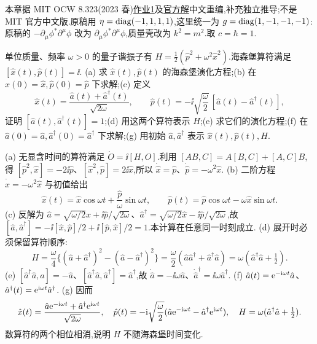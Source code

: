 本章据 MIT OCW 8.323(2023 春)\href{https://ocw.mit.edu/courses/8-323-relativistic-quantum-field-theory-i-spring-2023/mit8_323_s23_pset01.pdf}{作业1}及\href{https://ocw.mit.edu/courses/8-323-relativistic-quantum-field-theory-i-spring-2023/mit8_323_s23_pset_01sol.pdf}{官方解}中文重编,补充独立推导;不是 MIT 官方中文版.原稿用 $\eta=\operatorname{diag}(-1,1,1,1)$,这里统一为 $g=\operatorname{diag}(1,-1,-1,-1)$:原稿的 $-\partial_\mu\phi^*\partial^\mu\phi$ 改为 $\partial_\mu\phi^*\partial^\mu\phi$,质量壳改为 $k^2=m^2$.取 $c=\hbar=1$.

\begin{exercise}
单位质量、频率 $\omega>0$ 的量子谐振子有 $H=\tfrac12(\hat p^2+\omega^2\hat x^2)$.海森堡算符满足 $[\hat x(t),\hat p(t)]=\ii$.
(a) 求 $\hat x(t),\hat p(t)$ 的海森堡演化方程;(b) 在 $\hat x(0)=\hat x,\hat p(0)=\hat p$ 下求解;(c) 定义
\[
\hat x(t)=\frac{\hat a(t)+\hat a^\dagger(t)}{\sqrt{2\omega}},\qquad
\hat p(t)=-\ii\sqrt{\frac\omega2}\,[\hat a(t)-\hat a^\dagger(t)],
\]
证明 $[\hat a(t),\hat a^\dagger(t)]=1$;(d) 用这两个算符表示 $H$;(e) 求它们的演化方程;(f) 在 $\hat a(0)=\hat a,\hat a^\dagger(0)=\hat a^\dagger$ 下求解;(g) 用初始 $\hat a,\hat a^\dagger$ 表示 $\hat x(t),\hat p(t),H$.
\end{exercise}
\begin{solution}
(a) 无显含时间的算符满足 $\dot O=\ii[H,O]$.利用 $[AB,C]=A[B,C]+[A,C]B$,得 $[\hat p^2,\hat x]=-2\ii\hat p$、$[\hat x^2,\hat p]=2\ii\hat x$,所以 $\dot{\hat x}=\hat p$、$\dot{\hat p}=-\omega^2\hat x$.
(b) 二阶方程 $\ddot{\hat x}=-\omega^2\hat x$ 与初值给出
\[
\hat x(t)=\hat x\cos\omega t+\frac{\hat p}{\omega}\sin\omega t,\qquad
\hat p(t)=\hat p\cos\omega t-\omega\hat x\sin\omega t.
\]
(c) 反解为 $\hat a=\sqrt{\omega/2}\hat x+\ii\hat p/\sqrt{2\omega}$、$\hat a^\dagger=\sqrt{\omega/2}\hat x-\ii\hat p/\sqrt{2\omega}$,故
$[\hat a,\hat a^\dagger]=-\ii[\hat x,\hat p]/2+\ii[\hat p,\hat x]/2=1$.本计算在任意同一时刻成立.
(d) 展开时必须保留算符顺序:
\[
H=\frac\omega4\{(\hat a+\hat a^\dagger)^2-(\hat a-\hat a^\dagger)^2\}
=\frac\omega2(\hat a\hat a^\dagger+\hat a^\dagger\hat a)
=\omega(\hat a^\dagger\hat a+\tfrac12).
\]
(e) $[\hat a^\dagger\hat a,\hat a]=-\hat a$、$[\hat a^\dagger\hat a,\hat a^\dagger]=\hat a^\dagger$,故 $\dot{\hat a}=-\ii\omega\hat a$、$\dot{\hat a}^\dagger=\ii\omega\hat a^\dagger$.
(f) $\hat a(t)=\mathrm e^{-\mathrm i\omega t}\hat a$、$\hat a^\dagger(t)=\mathrm e^{\mathrm i\omega t}\hat a^\dagger$.
(g) 因而
\[
\hat x(t)=\frac{\hat a\mathrm e^{-\mathrm i\omega t}+\hat a^\dagger\mathrm e^{\mathrm i\omega t}}{\sqrt{2\omega}},\quad
\hat p(t)=-\mathrm i\sqrt{\frac\omega2}(\hat a\mathrm e^{-\mathrm i\omega t}-\hat a^\dagger\mathrm e^{\mathrm i\omega t}),\quad
H=\omega(\hat a^\dagger\hat a+\tfrac12).
\]
数算符的两个相位相消,说明 $H$ 不随海森堡时间变化.
\end{solution}

